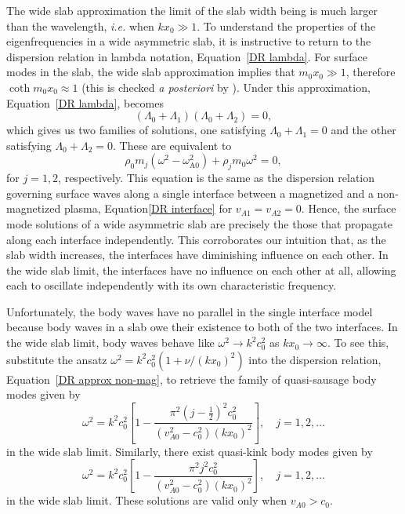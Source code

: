 \documentclass[12pt]{../style-files/ociamthesis}
\begin{document}
The wide slab approximation the limit of the slab width being is much larger than the wavelength, \textit{i.e.} when $kx_0 \gg 1$. To understand the properties of the eigenfrequencies in a wide asymmetric slab, it is instructive to return to the dispersion relation in lambda notation, Equation~\eqref{DR lambda}. For surface modes in the slab, the wide slab approximation implies that $m_0x_0 \gg 1$, therefore $\coth{m_0x_0} \approx 1$ (this is checked \textit{a posteriori} by \cite{rob81b}). Under this approximation, Equation~\eqref{DR lambda}, becomes
\begin{equation}
(\Lambda_0 + \Lambda_1)(\Lambda_0 + \Lambda_2) = 0,
\end{equation}
which gives us two families of solutions, one satisfying $\Lambda_0 + \Lambda_1 = 0$ and the other satisfying $\Lambda_0 + \Lambda_2 = 0$. These are equivalent to
\begin{equation}
	\rho_0m_j(\omega^2 - \omega_\textrm{A0}^2) + \rho_jm_0\omega^2 = 0,
\end{equation}
for $j = 1, 2$, respectively. This equation is the same as the dispersion relation governing surface waves along a single interface between a magnetized and a non-magnetized plasma, Equation\eqref{DR interface} for $v_{A1} = v_{A2} = 0$. Hence, the surface mode solutions of a wide asymmetric slab are precisely the those that propagate along each interface independently. This corroborates our intuition that, as the slab width increases, the interfaces have diminishing influence on each other. In the wide slab limit, the interfaces have no influence on each other at all, allowing each to oscillate independently with its own characteristic frequency.

Unfortunately, the body waves have no parallel in the single interface model because body waves in a slab owe their existence to both of the two interfaces. In the wide slab limit, body waves behave like $\omega^2 \to k^2c_0^2$ as $kx_0 \to \infty$. To see this, substitute the ansatz $\omega^2 = k^2c_0^2 \left(1 + \nu/(kx_0)^2\right)$ into the dispersion relation, Equation~\eqref{DR approx non-mag}, to retrieve the family of quasi-sausage body modes given by
\begin{equation}
\omega^2 = k^2c_0^2\left[1 - \frac{\pi^2(j - \frac{1}{2})^2c_0^2}{(v_{A0}^2 - c_0^2)(kx_0)^2}\right], \quad j = 1, 2, \ldots \label{wide slab saus body}
\end{equation}
in the wide slab limit. Similarly, there exist quasi-kink body modes given by
\begin{equation}
\omega^2 = k^2c_0^2\left[1 - \frac{\pi^2j^2c_0^2}{(v_{A0}^2 - c_0^2)(kx_0)^2}\right], \quad j = 1, 2, \ldots \label{wide slab kink body}
\end{equation}
in the wide slab limit. These solutions are valid only when $v_{A0} > c_0$.
\end{document}
